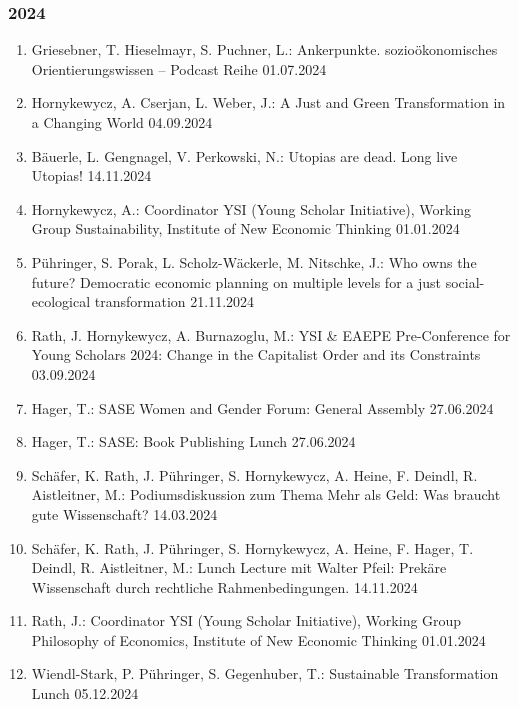 \subsubsection*{2024}
\begin{enumerate}
	\item Griesebner, T. Hieselmayr, S. Puchner, L.: Ankerpunkte. sozioökonomisches Orientierungswissen -- Podcast Reihe 01.07.2024
	\item Hornykewycz, A. Cserjan, L. Weber, J.: A Just and Green Transformation in a Changing World 04.09.2024
	\item Bäuerle, L. Gengnagel, V. Perkowski, N.: Utopias are dead. Long live Utopias! 14.11.2024
	\item Hornykewycz, A.: Coordinator YSI (Young Scholar Initiative), Working Group Sustainability, Institute of New Economic Thinking 01.01.2024
	\item Pühringer, S. Porak, L. Scholz-Wäckerle, M.   Nitschke, J.: Who owns the future? Democratic economic planning on multiple levels for a just social-ecological transformation 21.11.2024
	\item Rath, J. Hornykewycz, A. Burnazoglu, M.: YSI \& EAEPE Pre-Conference for Young Scholars 2024: Change in the Capitalist Order and its Constraints 03.09.2024
	\item Hager, T.: SASE Women and Gender Forum: General Assembly 27.06.2024
	\item Hager, T.: SASE: Book Publishing Lunch 27.06.2024
	\item Schäfer, K. Rath, J. Pühringer, S. Hornykewycz, A. Heine, F. Deindl, R. Aistleitner, M.: Podiumsdiskussion zum Thema \glqq Mehr als Geld: Was braucht gute Wissenschaft?\grqq{} 14.03.2024
	\item Schäfer, K. Rath, J. Pühringer, S. Hornykewycz, A. Heine, F. Hager, T. Deindl, R. Aistleitner, M.: Lunch Lecture mit Walter Pfeil: Prekäre Wissenschaft durch rechtliche Rahmenbedingungen. 14.11.2024
	\item Rath, J.: Coordinator YSI (Young Scholar Initiative), Working Group Philosophy of Economics, Institute of New Economic Thinking 01.01.2024
	\item Wiendl-Stark, P. Pühringer, S. Gegenhuber, T.: Sustainable Transformation Lunch 05.12.2024
\end{enumerate}
